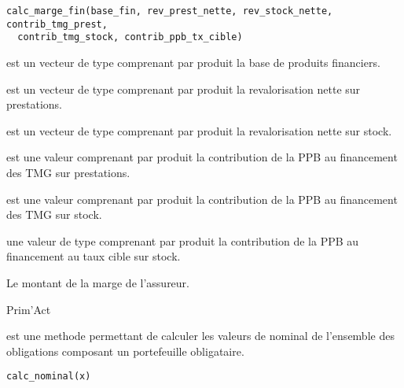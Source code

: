 \documentclass[a4paper]{book}
\begin{document}
%
\begin{Usage}
\begin{verbatim}
calc_marge_fin(base_fin, rev_prest_nette, rev_stock_nette, contrib_tmg_prest,
  contrib_tmg_stock, contrib_ppb_tx_cible)
\end{verbatim}
\end{Usage}
%
\begin{Arguments}
\begin{ldescription}
\item[\code{base\_fin}] est un vecteur de type  comprenant par produit la base de produits financiers.

\item[\code{rev\_prest\_nette}] est un vecteur de type  comprenant par produit
la revalorisation nette sur prestations.

\item[\code{rev\_stock\_nette}] est un vecteur de type  comprenant par produit
la revalorisation nette sur stock.

\item[\code{contrib\_tmg\_prest}] est une valeur  comprenant par produit
la contribution de la PPB au financement des TMG sur prestations.

\item[\code{contrib\_tmg\_stock}] est une valeur  comprenant par produit
la contribution de la PPB au financement des TMG sur stock.

\item[\code{contrib\_ppb\_tx\_cible}] une valeur de type  comprenant par produit
la contribution de la PPB au financement au taux cible sur stock.
\end{ldescription}
\end{Arguments}
%
\begin{Value}
Le montant de la marge de l'assureur.
\end{Value}
%
\begin{Author}\relax
Prim'Act
\end{Author}
%
\begin{Description}\relax
{} est une methode permettant de calculer les valeurs de nominal de l'ensemble des obligations
composant un portefeuille obligataire.
\end{Description}
%
\begin{Usage}
\begin{verbatim}
calc_nominal(x)
\end{verbatim}
\end{Usage}
\end{document}
